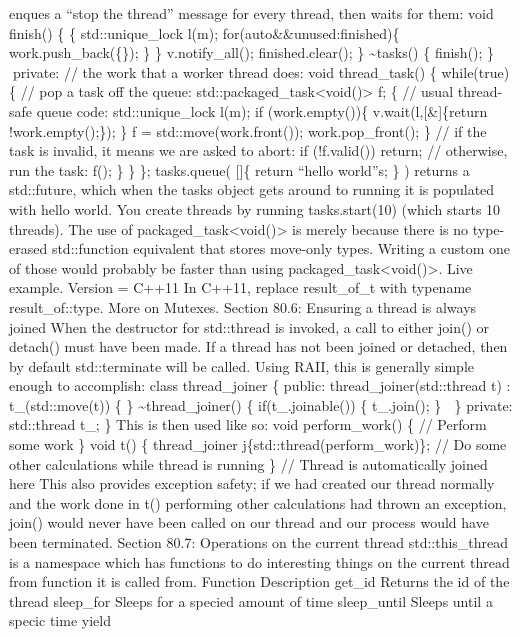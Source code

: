 enques a ``stop the thread'' message for every thread, then waits for
them: void finish() \{ \{ std::unique\_lock l(m);
for(auto\&\&unused:finished)\{ work.push\_back(\{\}); \} \}
v.notify\_all(); finished.clear(); \} \textasciitilde tasks() \{
finish(); \} private: // the work that a worker thread does: void
thread\_task() \{ while(true)\{ // pop a task off the queue:
std::packaged\_task\textless void()\textgreater{} f; \{ // usual
thread-safe queue code: std::unique\_lock l(m); if (work.empty())\{
v.wait(l,{[}\&{]}\{return !work.empty();\}); \} f =
std::move(work.front()); work.pop\_front(); \} // if the task is
invalid, it means we are asked to abort: if (!f.valid()) return; //
otherwise, run the task: f(); \} \} \}; tasks.queue( {[}{]}\{ return
``hello world''s; \} ) returns a std::future, which when the tasks
object gets around to running it is populated with hello world. You
create threads by running tasks.start(10) (which starts 10 threads). The
use of packaged\_task\textless void()\textgreater{} is merely because
there is no type-erased std::function equivalent that stores move-only
types. Writing a custom one of those would probably be faster than using
packaged\_task\textless void()\textgreater. Live example. Version =
C++11 In C++11, replace result\_of\_t with typename result\_of::type.
More on Mutexes. Section 80.6: Ensuring a thread is always joined When
the destructor for std::thread is invoked, a call to either join() or
detach() must have been made. If a thread has not been joined or
detached, then by default std::terminate will be called. Using RAII,
this is generally simple enough to accomplish: class thread\_joiner \{
public: thread\_joiner(std::thread t) : t\_(std::move(t)) \{ \}
\textasciitilde thread\_joiner() \{ if(t\_.joinable()) \{ t\_.join(); \}
 \} private: std::thread t\_; \} This is then used like so: void
perform\_work() \{ // Perform some work \} void t() \{ thread\_joiner
j\{std::thread(perform\_work)\}; // Do some other calculations while
thread is running \} // Thread is automatically joined here This also
provides exception safety; if we had created our thread normally and the
work done in t() performing other calculations had thrown an exception,
join() would never have been called on our thread and our process would
have been terminated. Section 80.7: Operations on the current thread
std::this\_thread is a namespace which has functions to do interesting
things on the current thread from function it is called from. Function
Description get\_id Returns the id of the thread sleep\_for Sleeps for a
specied amount of time sleep\_until Sleeps until a specic time yield
